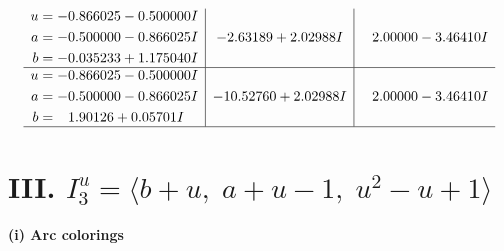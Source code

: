 \documentclass[1p]{elsarticle_modified}
\theoremstyle{definition}
\begin{document}
$$\begin{array}{c|c|c}
\begin{aligned}
u &= -0.866025 - 0.500000 I \\
a &= -0.500000 - 0.866025 I \\
b &= -0.035233 + 1.175040 I\end{aligned}
 & -2.63189 + 2.02988 I & \phantom{-}2.00000 - 3.46410 I \\ \hline\begin{aligned}
u &= -0.866025 - 0.500000 I \\
a &= -0.500000 - 0.866025 I \\
b &= \phantom{-}1.90126 + 0.05701 I\end{aligned}
 & -10.52760 + 2.02988 I & \phantom{-}2.00000 - 3.46410 I\\
 \hline 
 \end{array}$$\newpage\newpage\renewcommand{\arraystretch}{1}
\centering \section*{III. $I^u_{3}= \langle b+u,\;a+u-1,\;u^2- u+1 \rangle$}
\flushleft \textbf{(i) Arc colorings}\\
\end{document}
